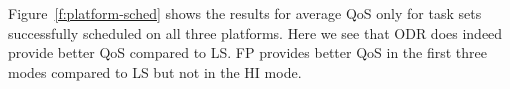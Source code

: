 	Figure~\ref{f:platform-sched} shows the results for average QoS only for task sets successfully scheduled on all three platforms. 
	Here we see that ODR does indeed provide better QoS compared to LS.
	FP provides better QoS in the first three modes compared to LS but not in the HI mode.
	

